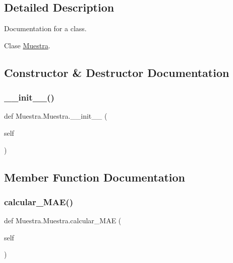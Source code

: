 \subsection{Detailed Description}
Documentation for a class. 

Clase \mbox{\hyperlink{class_muestra_1_1_muestra}{Muestra}}. 

\subsection{Constructor \& Destructor Documentation}
\mbox{\label{class_muestra_1_1_muestra_a32851be663e08872a32e6a8ace2a3dbc}} 
\subsubsection{\texorpdfstring{\+\_\+\+\_\+init\+\_\+\+\_\+()}{\_\_init\_\_()}}
{\footnotesize\ttfamily def Muestra.\+Muestra.\+\_\+\+\_\+init\+\_\+\+\_\+ (\begin{DoxyParamCaption}\item[{}]{self }\end{DoxyParamCaption})}



\subsection{Member Function Documentation}
\mbox{\label{class_muestra_1_1_muestra_a2bdfb143b9dcb7290be26a6bd84e72ec}} 
\subsubsection{\texorpdfstring{calcular\+\_\+\+M\+A\+E()}{calcular\_MAE()}}
{\footnotesize\ttfamily def Muestra.\+Muestra.\+calcular\+\_\+\+M\+AE (\begin{DoxyParamCaption}\item[{}]{self }\end{DoxyParamCaption})}



